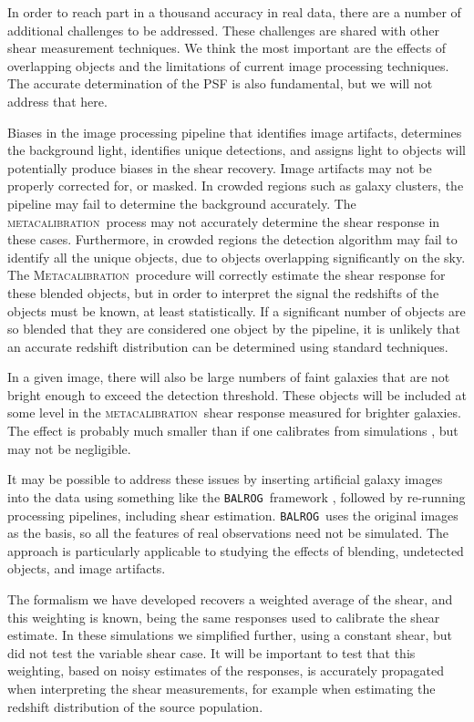\documentclass[iop]{emulateapj}
\newcommand{\mcal}{\textsc{metacalibration}}
\newcommand{\Mcal}{\textsc{Metacalibration}}
\newcommand{\balrog}{\texttt{BALROG}}
\begin{document}
In order to reach part in a thousand accuracy in real data, there are a number
of additional challenges to be addressed.  These challenges are shared with
other shear measurement techniques.  We think the most important are the
effects of overlapping objects and the limitations of current image processing
techniques. The accurate determination of the PSF is also fundamental, but we
will not address that here.

Biases in the image processing pipeline that identifies image artifacts,
determines the background light, identifies unique detections, and assigns
light to objects will potentially produce biases in the shear recovery.  Image
artifacts may not be properly corrected for, or masked.  In crowded regions
such as galaxy clusters, the pipeline may fail to determine the background
accurately.  The \mcal\ process may not accurately determine the shear response
in these cases.  Furthermore, in crowded regions the detection algorithm may
fail to identify all the unique objects, due to objects overlapping
significantly on the sky.  The \Mcal\ procedure will correctly estimate the
shear response for these blended objects, but in order to interpret the signal
the redshifts of the objects must be known, at least statistically.  If a
significant number of objects are so blended that they are considered one
object by the pipeline, it is unlikely that an accurate redshift distribution
can be determined using standard techniques.

In a given image, there will also be large numbers of faint galaxies that are
not bright enough to exceed the detection threshold.  These objects will be
included at some level in the \mcal\ shear response measured for brighter
galaxies.  The effect is probably much smaller than if one calibrates from
simulations \citep[see e.g.][]{Hoekstra2016}, but may not be negligible.

It may be possible to address these issues by inserting artificial galaxy
images into the data using something like the \balrog\ framework
\citep{Balrog2016}, followed by re-running processing pipelines, including
shear estimation.  \balrog\ uses the original images as the basis, so all the
features of real observations need not be simulated.  The approach is
particularly applicable to studying the effects of blending, undetected
objects, and image artifacts.

The formalism we have developed recovers a weighted average of the shear, and
this weighting is known, being the same responses used to calibrate the shear
estimate.  In these simulations we simplified further, using a constant shear,
but did not test the variable shear case.  It will be important to test that
this weighting, based on noisy estimates of the responses, is accurately
propagated when interpreting the shear measurements, for example when
estimating the redshift distribution of the source population.
\end{document}
